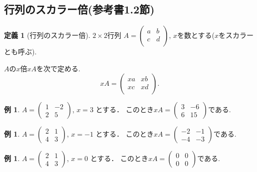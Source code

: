 \documentclass[dvipdfmx,a4paper,11pt]{article}
\theoremstyle{definition}
\newtheorem{dfn}[thm]{定義}
\newtheorem{exa}[thm]{例}
\begin{document}
 \subsection{行列のスカラー倍(参考書1.2節)}
 
  \begin{tcolorbox}[
    colback = white,
    colframe = green!35!black,
    fonttitle = \bfseries,
    breakable = true]
    \begin{dfn}[行列のスカラー倍]
    \text{}
    
$2 \times 2$行列
$
A=\begin{pmatrix}
a& b \\
c& d \\
\end{pmatrix}
$, $x$を数とする($x$をスカラーとも呼ぶ).

$A$の$x$倍$xA$を次で定める.
$$
xA=
\begin{pmatrix}
xa&xb \\
xc&xd \\
\end{pmatrix}.
$$
  \end{dfn}
 \end{tcolorbox}

\begin{exa}
 $A = 
 \begin{pmatrix}
 1 &-2 \\
 2&5
 \end{pmatrix}
 $,
 $
 x =3
 $
 とする．
 このとき$
 xA =
 \begin{pmatrix}
 3 &-6 \\
 6&15
 \end{pmatrix}
 $である.
 \end{exa}
 \begin{exa}
 $A = 
 \begin{pmatrix}
 2&1 \\
 4&3
 \end{pmatrix}
 $, 
 $
 x =-1
 $
 とする．
 このとき$
 xA =
 \begin{pmatrix}
 -2 &-1 \\
-4&-3
 \end{pmatrix}
 $である.
 \end{exa}
  \begin{exa}
 $A = 
 \begin{pmatrix}
 2&1 \\
 4&3
 \end{pmatrix}
 $, 
 $
 x =0
 $
 とする．
 このとき$
 xA =
 \begin{pmatrix}
 0&0\\
0&0
 \end{pmatrix}
 $である.
 \end{exa}
 
\end{document}
